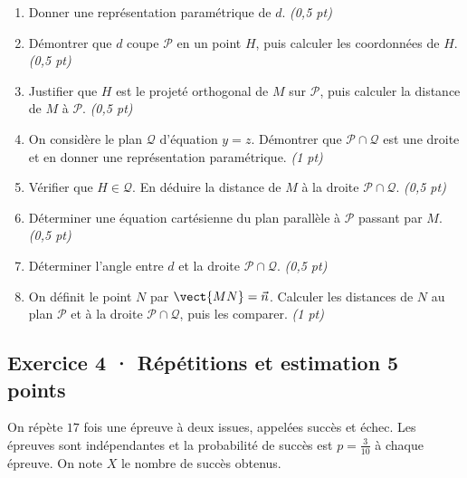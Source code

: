 \begin{enumerate}

\item Donner une représentation paramétrique de $d$. \hfill\textit{(0{,}5 pt)}

\item Démontrer que $d$ coupe $\mathcal P$ en un point $H$, puis calculer les coordonnées de $H$. \hfill\textit{(0{,}5 pt)}

\item Justifier que $H$ est le projeté orthogonal de $M$ sur $\mathcal P$, puis calculer la distance de $M$ à $\mathcal P$. \hfill\textit{(0{,}5 pt)}

\item On considère le plan $\mathcal Q$ d'équation $y=z$. Démontrer que $\mathcal P\cap\mathcal Q$ est une droite et en donner une représentation paramétrique. \hfill\textit{(1 pt)}

\item Vérifier que $H\in\mathcal Q$. En déduire la distance de $M$ à la droite $\mathcal P\cap\mathcal Q$. \hfill\textit{(0{,}5 pt)}

\item Déterminer une équation cartésienne du plan parallèle à $\mathcal P$ passant par $M$. \hfill\textit{(0{,}5 pt)}

\item Déterminer l'angle entre $d$ et la droite $\mathcal P\cap\mathcal Q$. \hfill\textit{(0{,}5 pt)}

\item On définit le point $N$ par $\vect{MN}=\vec n$. Calculer les distances de $N$ au plan $\mathcal P$ et à la droite $\mathcal P\cap\mathcal Q$, puis les comparer. \hfill\textit{(1 pt)}

\end{enumerate}

\subsection*{Exercice 4 · Répétitions et estimation \hfill 5 points}On répète $17$ fois une épreuve à deux issues, appelées succès et échec. Les épreuves sont indépendantes et la probabilité de succès est $p=\frac{3}{10}$ à chaque épreuve. On note $X$ le nombre de succès obtenus.

